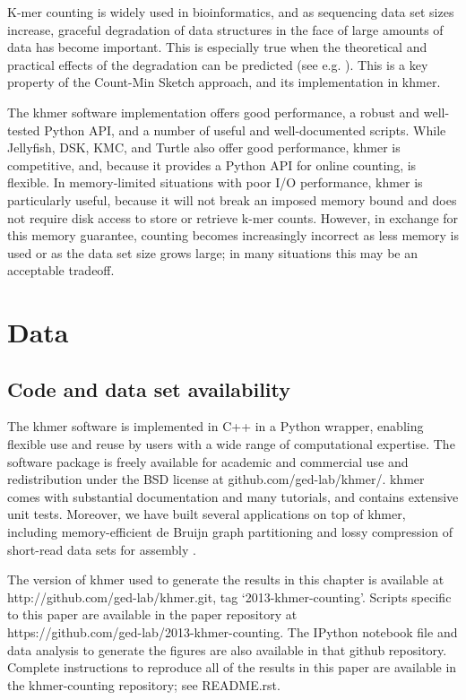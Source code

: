 K-mer counting is widely used in bioinformatics, and as sequencing
data set sizes increase, graceful degradation of data structures in
the face of large amounts of data has become important.  This is
especially true when the theoretical and practical effects of the
degradation can be predicted (see e.g. \cite{Melsted2011, Pell2012,
  Roy2014}).  This is a key property of the Count-Min Sketch approach,
and its implementation in khmer.

The khmer software implementation offers good performance, a robust
and well-tested Python API, and a number of useful and well-documented
scripts.  While Jellyfish, DSK, KMC, and Turtle also offer good
performance, khmer is competitive, and, because it provides a Python
API for online counting, is flexible.  In memory-limited situations
with poor I/O performance, khmer is particularly useful, because it
will not break an imposed memory bound and does not require disk
access to store or retrieve k-mer counts.  However, in exchange for
this memory guarantee, counting becomes increasingly incorrect as less
memory is used or as the data set size grows large; in many situations
this may be an acceptable tradeoff.

\section{Data}

\subsection{Code and data set availability}


The khmer software \cite{khmer} is implemented in C++ in a Python
wrapper, enabling flexible use and reuse by users with a wide range of
computational expertise.  The software package is freely available for
academic and commercial use and redistribution under the BSD license
at github.com/ged-lab/khmer/.  khmer comes with substantial
documentation and many tutorials, and contains extensive unit tests.
Moreover, we have built several applications on top of khmer,
including memory-efficient de Bruijn graph partitioning
\cite{Pell2012} and lossy compression of short-read data sets for
assembly \cite{Brown2012}.

The version of khmer used to generate the results in this chapter is available
at \\
http://github.com/ged-lab/khmer.git, tag `2013-khmer-counting'.
Scripts specific to this paper are available in the paper repository
at \\
https://github.com/ged-lab/2013-khmer-counting.
The IPython\cite{4160251} notebook file and data analysis to generate the figures are also
available in that github repository.  Complete instructions to reproduce
all of the results in this paper are available in the khmer-counting
repository; see README.rst.

